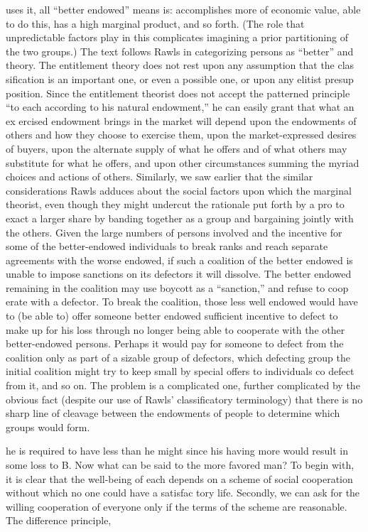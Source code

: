\documentclass[11pt,openany]{book}
\begin{document}
{uses it, all ``better endowed'' means is: accomplishes more of economic value, able to do this, has a high marginal product, and so forth. (The role that unpredictable factors play in this complicates imagining a prior partitioning of the two groups.) The text follows Rawls in categorizing persons as ``better'' and theory. The entitlement theory does not rest upon any assumption that the clas sification is an important one, or even a possible one, or upon any elitist presup position. Since the entitlement theorist does not accept the patterned principle ``to each according to his natural endowment,'' he can easily grant that what an ex ercised endowment brings in the market will depend upon the endowments of others and how they choose to exercise them, upon the market-expressed desires of buyers, upon the alternate supply of what he offers and of what others may substitute for what he offers, and upon other circumstances summing the myriad choices and actions of others. Similarly, we saw earlier that the similar considerations Rawls adduces about the social factors upon which the marginal theorist, even though they might undercut the rationale put forth by a pro to exact a larger share by banding together as a group and bargaining jointly with the others. Given the large numbers of persons involved and the incentive for some of the better-endowed individuals to break ranks and reach separate agreements with the worse endowed, if such a coalition of the better endowed is unable to impose sanctions on its defectors it will dissolve. The better endowed remaining in the coalition may use boycott as a ``sanction,'' and refuse to coop erate with a defector. To break the coalition, those less well endowed would have to (be able to) offer someone better endowed sufficient incentive to defect to make up for his loss through no longer being able to cooperate with the other better-endowed persons. Perhaps it would pay for someone to defect from the coalition only as part of a sizable group of defectors, which defecting group the initial coalition might try to keep small by special offers to individuals co defect from it, and so on. The problem is a complicated one, further complicated by the obvious fact (despite our use of Rawls' classificatory terminology) that there is no sharp line of cleavage between the endowments of people to determine which groups would form.\par

he is required to have less than he might since his having more would result in some loss to B. Now what can be said to the more favored man? To begin with, it is clear that the well-being of each depends on a scheme of social cooperation without which no one could have a satisfac tory life. Secondly, we can ask for the willing cooperation of everyone only if the terms of the scheme are reasonable. The difference principle,\par

}
\end{document}
